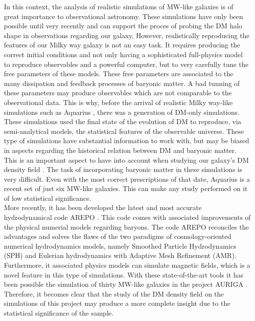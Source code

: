\documentclass[12pt]{article}
\begin{document}
In this context, the analysis of realistic simulations of MW-like galaxies is of great importance to observational astronomy. 
These simulations have only been possible until very recently \cite{aquarius} and can support the proces of probing the DM halo shape in observations regarding our galaxy.
However, realistically reproducing the features of our Milky way galaxy is not an easy task. 
It requires producing the correct initial conditions and not only having a sophisticated full-physics model to reproduce observables and a powerful computer, but to very carefully tune the free parameters of these models. 
These free parameters are associated to the many dissipation and feedback processes of baryonic matter.
A bad tunning of these parameters may produce observables which are not comparable to the observational data.
This is why, before the arrival of realistic Milky way-like simulations such as Aquarius \cite{aquarius}, there was a generation of DM-only simulations.
These simulations used the final state of the evolution of DM to reproduce, via semi-analytical models, the statistical features of the observable universe. 
These type of simulations have substantial information to work with, but may be biased in aspects regarding the historical relation between DM and baryonic matter.
This is an important aspect to have into account when studying our galaxy's DM density field \cite{relation DM baryons is important}.
The task of incorporating baryonic matter in these simulations is very difficult.
Even with the most correct prescriptions of that date, Aquarius is a recent set of just six MW-like galaxies.
This can make any study performed on it of low statistical significance.\\

More recently, it has been developed the latest and most accurate hydrodynamical code AREPO \cite{arepo}. 
This code comes with associated improvements of the physical numerial models regarding baryons. 
The code AREPO reconciles the advantages and solves the flaws of the two paradigms of cosmology-oriented numerical hydrodynamics models, namely Smoothed Particle Hydrodynamics (SPH) and Eulerian hydrodynamics with Adaptive Mesh Refinement (AMR). 
Furthermore, it associated physics models can simulate magnetic fields, which is a novel feature in this type of simulations. 
With these state-of-the-art tools it has been possible the simulation of thirty MW-like galaxies in the project AURIGA \cite{auriga}.
Therefore, it becomes clear that the study of the DM density field on the simulations of this project may produce a more complete insight due to the statistical significance of the sample.
\\
\end{document}
